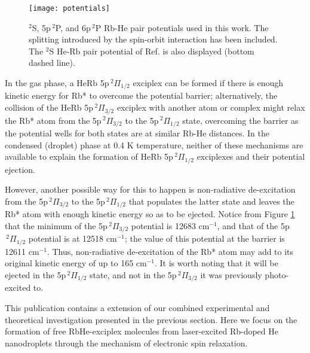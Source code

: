 		\begin{figure}[t]
			\begin{center}
				\texttt{[image: potentials]}
			\end{center}
			\caption{$^2$S, 5p$\,^2$P, and 6p$\,^2$P Rb-He pair potentials used in this work. The splitting introduced by the spin-orbit interaction has been included. The $^2$S He-Rb pair potential of Ref.  is also displayed (bottom dashed line).}
			\label{fig:potentials}
		\end{figure}
		
		In the gas phase, a HeRb 5p$\,^2\Pi_{1/2}$ exciplex can be formed if there is enough kinetic energy for Rb* to overcome the potential barrier; alternatively, the collision of the HeRb 5p$\,^2\Pi_{3/2}$ exciplex with another atom or complex might relax the Rb* atom from the 5p$\,^2\Pi_{3/2}$ to the 5p$\,^2\Pi_{1/2}$ state, overcoming the barrier as the potential wells for both states are at similar Rb-He distances. In the condensed (droplet) phase at 0.4 K temperature, neither of these mechanisms are available to explain the formation of HeRb 5p$\,^2\Pi_{1/2}$ exciplexes and their potential ejection.

		However, another possible way for this to happen is non-radiative de-excitation from the 5p$\,^2\Pi_{3/2}$ to the 5p$\,^2\Pi_{1/2}$ that populates the latter state and leaves the Rb* atom with enough kinetic energy so as to be ejected. Notice from Figure \ref{fig:potentials} that the minimum of the 5p$\,^2\Pi_{3/2}$ potential is 12683 cm$^{-1}$, and that of the 5p$\,^2\Pi_{1/2}$ potential is at 12518 cm$^{-1}$; the value of this potential at the barrier is 12611 cm$^{-1}$. Thus, non-radiative de-excitation of the Rb* atom may add to its original kinetic energy of up to 165 cm$^{-1}$. It is worth noting that it will be ejected in the 5p$\,^2\Pi_{1/2}$ state, and not in the 5p$\,^2\Pi_{3/2}$ it was previously photo-excited to.
		
		This publication contains a extension of our combined experimental and theoretical investigation presented in the previous section. Here we focus on the formation of free RbHe-exciplex molecules from laser-excited Rb-doped He nanodroplets through the mechanism of electronic spin relaxation.%

		\cleardoublepage
		
		
